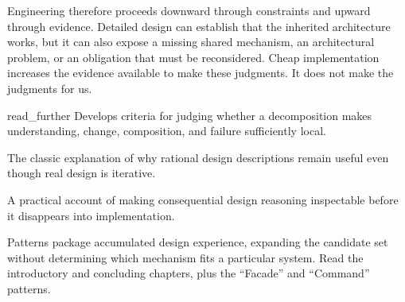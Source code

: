 Engineering therefore proceeds downward through constraints and upward through evidence.
Detailed design can establish that the inherited architecture works, but it can also expose a missing shared mechanism, an architectural problem, or an obligation that must be reconsidered.
Cheap implementation increases the evidence available to make these judgments.
It does not make the judgments for us.

\begin{bookbox}{read_further}{} %
\citep[chap.~2, ``Modularity'']{meyer1997oosc} Develops criteria for judging whether a decomposition makes understanding, change, composition, and failure sufficiently local.

\citep{parnas1986rational} The classic explanation of why rational design descriptions remain useful even though real design is iterative.

\citep{designdocs-google} A practical account of making consequential design reasoning inspectable before it disappears into implementation.

\citep[chaps. 1 and 6]{gof1994} Patterns package accumulated design experience, expanding the candidate set without determining which mechanism fits a particular system. Read the introductory and concluding chapters, plus the ``Facade'' and ``Command'' patterns.
\end{bookbox}
